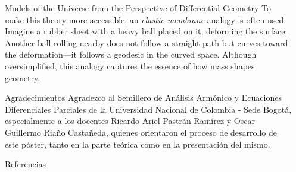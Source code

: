 \documentclass[final]{beamer}
\newlength{\sepwidth}
\newlength{\colwidth}
\newcommand{\separatorcolumn}{\begin{column}{\sepwidth}\end{column}}
\begin{document}
\begin{frame}[t]
\begin{columns}[t]
\begin{column}{\colwidth}
\begin{alertblock}{Models of the Universe from the Perspective of Differential Geometry}
        To make this theory more accessible, an \textit{elastic membrane} analogy is often used. Imagine a rubber sheet with a heavy ball placed on it, deforming the surface. Another ball rolling nearby does not follow a straight path but curves toward the deformation—it follows a geodesic in the curved space. Although oversimplified, this analogy captures the essence of how mass shapes geometry.
  \end{alertblock}

  \begin{block}{Agradecimientos}
    Agradezco al Semillero de Análisis Armónico y Ecuaciones Diferenciales Parciales de la Universidad Nacional de Colombia - Sede Bogotá, especialmente a los docentes Ricardo Ariel Pastrán Ramírez y Oscar Guillermo Riaño Castañeda, quienes orientaron el proceso de desarrollo de este póster, tanto en la parte teórica como en la presentación del mismo.
  \end{block}

  \begin{block}{Referencias}

    \nocite{*}
    \footnotesize{
      
      
    }

  \end{block}

\end{column}
\separatorcolumn



\end{columns}
\end{frame}
\end{document}
